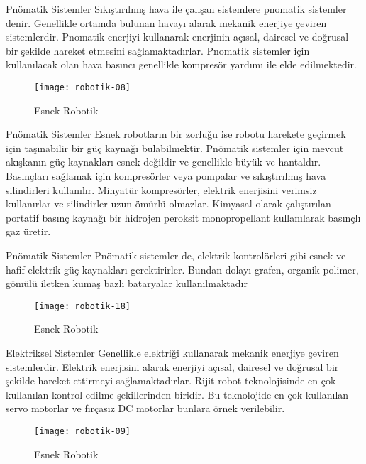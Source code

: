 \documentclass{beamer}
\begin{document}
\begin{frame}
\begin{block}{Pnömatik Sistemler}
Sıkıştırılmış hava ile çalışan sistemlere pnomatik sistemler denir. Genellikle ortamda bulunan havayı alarak mekanik enerjiye çeviren sistemlerdir. Pnomatik enerjiyi kullanarak enerjinin açısal, dairesel ve doğrusal bir şekilde hareket etmesini sağlamaktadırlar. Pnomatik sistemler için kullanılacak olan hava basıncı genellikle kompresör yardımı ile elde edilmektedir. 
\end{block}

\begin{figure}
\texttt{[image: robotik-08]}
\caption{\label{Şekil-8} Esnek Robotik}
\end{figure}
\end{frame}

\begin{frame}
\begin{block}{Pnömatik Sistemler}
Esnek robotların bir zorluğu ise robotu harekete geçirmek için taşınabilir bir güç kaynağı bulabilmektir. Pnömatik sistemler için mevcut akışkanın güç kaynakları esnek değildir ve genellikle büyük ve hantaldır. Basınçları sağlamak için kompresörler veya pompalar ve sıkıştırılmış hava silindirleri kullanılır. Minyatür kompresörler, elektrik enerjisini verimsiz kullanırlar ve silindirler uzun ömürlü olmazlar. Kimyasal olarak çalıştırılan portatif basınç kaynağı bir hidrojen peroksit monopropellant kullanılarak basınçlı gaz üretir.
\end{block}
\end{frame}

\begin{frame}
\begin{block}{Pnömatik Sistemler}
Pnömatik sistemler de, elektrik kontrolörleri gibi esnek ve hafif elektrik güç kaynakları gerektirirler. Bundan dolayı grafen, organik polimer, gömülü iletken kumaş bazlı bataryalar kullanılmaktadır
\end{block}

\begin{figure}
\texttt{[image: robotik-18]}
\caption{\label{Şekil-9} Esnek Robotik}
\end{figure}
\end{frame}

\begin{frame}
\begin{block}{Elektriksel Sistemler}
Genellikle elektriği kullanarak mekanik enerjiye çeviren sistemlerdir. Elektrik enerjisini alarak enerjiyi açısal, dairesel ve doğrusal bir şekilde hareket ettirmeyi sağlamaktadırlar. Rijit robot teknolojisinde en çok kullanılan kontrol edilme şekillerinden biridir. Bu teknolojide en çok kullanılan servo motorlar ve fırçasız DC motorlar bunlara örnek verilebilir.
\end{block}

\begin{figure}
\texttt{[image: robotik-09]}
\caption{\label{Şekil-10} Esnek Robotik}
\end{figure}
\end{frame}
\end{document}
